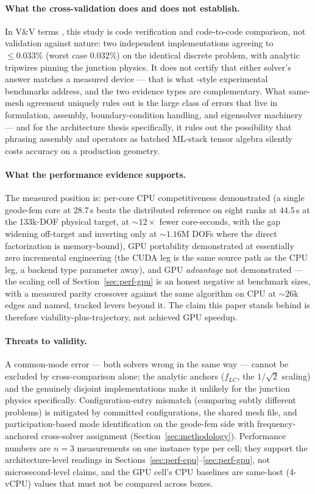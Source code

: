 \documentclass{anvil-paper}
\begin{document}
\paragraph{What the cross-validation does and does not establish.}
In V\&V terms \citep{roache1997quantification,oberkampf2010verification},
this study is code verification and code-to-code comparison, not
validation against nature: two independent implementations agreeing to
$\leq 0.033\%$ (worst case $0.032\%$) on the identical discrete problem,
with analytic tripwires pinning the junction physics. It does not certify
that either solver's answer matches a measured device --- that is what
\citet{ye2025electromagnetic}-style experimental benchmarks address, and
the two evidence types are complementary. What same-mesh agreement
uniquely rules out is the large class of errors that live in formulation,
assembly, boundary-condition handling, and eigensolver machinery --- and
for the architecture thesis specifically, it rules out the possibility
that phrasing assembly and operators as batched ML-stack tensor algebra
silently costs accuracy on a production geometry.

\paragraph{What the performance evidence supports.}
The measured position is: per-core CPU competitiveness demonstrated (a
single geode-fem core at $28.7$\,s beats the distributed reference on
eight ranks at $44.5$\,s at the 133k-DOF physical target, at
${\sim}12\times$ fewer core-seconds, with the gap widening off-target and
inverting only at ${\sim}1.16$M DOFs where the direct factorization is
memory-bound), GPU
portability demonstrated at essentially zero incremental engineering (the
CUDA leg is the same source path as the CPU leg, a backend type parameter
away), and GPU \emph{advantage} not demonstrated --- the scaling cell of
Section~\ref{sec:perf-gpu} is an honest negative at benchmark sizes, with
a measured parity crossover against the same algorithm on CPU at
${\sim}26$k edges and named, tracked levers beyond it. The claim this
paper stands behind is therefore viability-plus-trajectory, not achieved
GPU speedup.

\paragraph{Threats to validity.}
A common-mode error --- both solvers wrong in the same way --- cannot be
excluded by cross-comparison alone; the analytic anchors ($f_{LC}$, the
$1/\sqrt{2}$ scaling) and the genuinely disjoint implementations make it
unlikely for the junction physics specifically. Configuration-entry
mismatch (comparing subtly different problems) is mitigated by committed
configurations, the shared mesh file, and participation-based mode
identification on the geode-fem side with frequency-anchored cross-solver
assignment (Section~\ref{sec:methodology}). Performance numbers are $n = 3$
measurements on one instance type per cell; they support the
architecture-level readings in
Sections~\ref{sec:perf-cpu}--\ref{sec:perf-gpu}, not microsecond-level
claims, and the GPU cell's CPU baselines are same-host (4-vCPU) values
that must not be compared across boxes.
\end{document}
